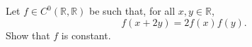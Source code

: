\begin{problem}
    Let \( f \in C^0\left(\mathbb{R},\mathbb{R}\right) \) be such that, for all \( x, y \in \mathbb{R} \),
    \[
        f\left(x+2y\right) = 2f\left(x\right)f\left(y\right).
    \]
    Show that \( f \) is constant.
\end{problem}
